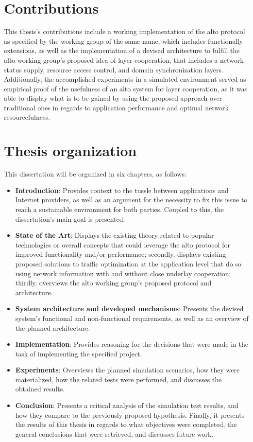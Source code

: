 \section{Contributions}

    This thesis's contributions include a working implementation of the \gls{alto} protocol as specified by the working group of the same name, which includes functionally extensions, as well as the implementation of a devised architecture to fulfill the \gls{alto} working group's proposed idea of layer cooperation, that includes a network status supply, resource access control, and domain synchronization layers.
    Additionally, the accomplished experiments in a simulated environment served as empirical proof of the usefulness of an \gls{alto} system for layer cooperation, as it was able to display what is to be gained by using the proposed approach over traditional ones in regards to application performance and optimal network resourcefulness.

\section{Thesis organization}

    This dissertation will be organized in six chapters, as follows:

\begin{itemize}
    \item \textbf{Introduction}: Provides context to the tussle between applications and Internet providers, as well as an argument for the necessity to fix this issue to reach a sustainable environment for both parties. Coupled to this, the dissertation's main goal is presented.
    \item \textbf{State of the Art}: Displays the existing theory related to popular technologies or overall concepts that could leverage the \gls{alto} protocol for improved functionality and/or performance; secondly, displays existing proposed solutions to traffic optimization at the application level that do so using network information with and without close underlay cooperation; thirdly, overviews the \gls{alto} working group's proposed protocol and architecture.
    \item \textbf{System architecture and developed mechanisms}: Presents the devised system's functional and non-functional requirements, as well as an overview of the planned architecture.
    \item \textbf{Implementation}: Provides reasoning for the decisions that were made in the task of implementing the specified project.
    \item \textbf{Experiments}: Overviews the planned simulation scenarios, how they were materialized, how the related tests were performed, and discusses the obtained results.
    \item \textbf{Conclusion}: Presents a critical analysis of the simulation test results, and how they compare to the previously proposed hypothesis. Finally, it presents the results of this thesis in regards to what objectives were completed, the general conclusions that were retrieved, and discusses future work.
\end{itemize}{}

